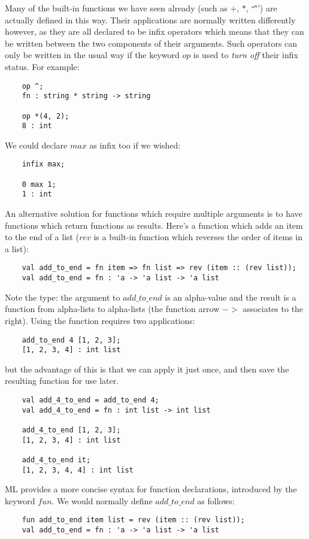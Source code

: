 Many of the built-in functions we have seen already (such as $+$, $*$,
``\^'') are actually defined in this way. Their applications are normally
written differently however, as they are all declared to be infix
operators which means that they can be written between the two
components of their arguments. Such operators can only be written in the
usual way if the keyword $op$ is used to {\em turn off} their infix status.
For example:
\begin{verbatim}
    op ^;
    fn : string * string -> string

    op *(4, 2);
    8 : int
\end{verbatim}

We could declare $max$ as infix too if we wished:
\begin{verbatim}
    infix max;

    0 max 1;
    1 : int
\end{verbatim}

An alternative solution for functions which require multiple arguments
is to have functions which return functions as results. Here's a
function which adds an item to the end of a list ($rev$ is a built-in
function which reverses the order of items in a list):
\begin{verbatim}
    val add_to_end = fn item => fn list => rev (item :: (rev list));
    val add_to_end = fn : 'a -> 'a list -> 'a list

\end{verbatim}
Note the type: the argument to $add\_to\_end$ is an alpha-value and the
result is a function from alpha-lists to alpha-lists (the function arrow
$->$ associates to the right). Using the function requires two
applications:
\begin{verbatim}
    add_to_end 4 [1, 2, 3];
    [1, 2, 3, 4] : int list
\end{verbatim}

but the advantage of this is that we can apply it just once, and then
save the resulting function for use later.
\begin{verbatim}
    val add_4_to_end = add_to_end 4;
    val add_4_to_end = fn : int list -> int list

    add_4_to_end [1, 2, 3];
    [1, 2, 3, 4] : int list

    add_4_to_end it;
    [1, 2, 3, 4, 4] : int list
\end{verbatim}

ML provides a more concise syntax for function declarations, introduced
by the keyword $fun$. We would normally define $add\_to\_end$ as follows:
\begin{verbatim}
    fun add_to_end item list = rev (item :: (rev list));
    val add_to_end = fn : 'a -> 'a list -> 'a list
\end{verbatim}

